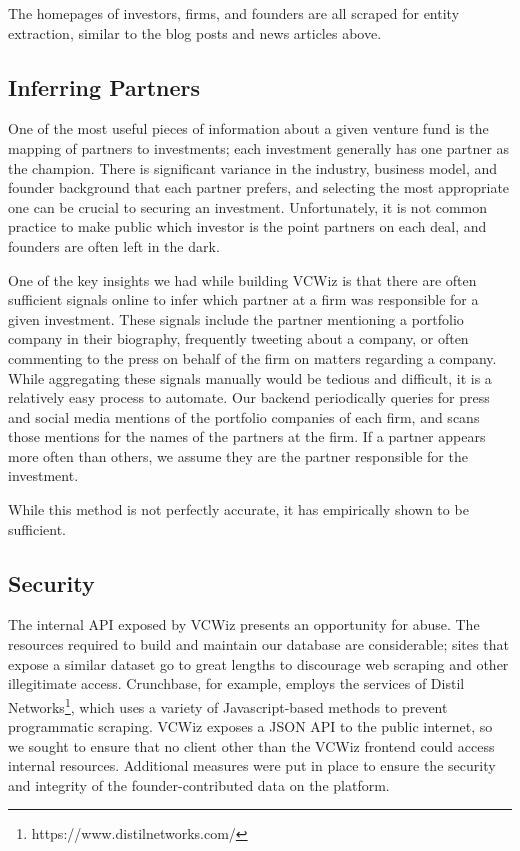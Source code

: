 The homepages of investors, firms, and founders are all scraped for entity extraction, similar to the blog posts and news articles above.

\subsection{Inferring Partners}
\label{ch4:partners}

One of the most useful pieces of information about a given venture fund is the mapping of partners to investments; each investment generally has one partner as the champion. There is significant variance in the industry, business model, and founder background that each partner prefers, and selecting the most appropriate one can be crucial to securing an investment. Unfortunately, it is not common practice to make public which investor is the point partners on each deal, and founders are often left in the dark.

One of the key insights we had while building VCWiz is that there are often sufficient signals online to infer which partner at a firm was responsible for a given investment. These signals include the partner mentioning a portfolio company in their biography, frequently tweeting about a company, or often commenting to the press on behalf of the firm on matters regarding a company. While aggregating these signals manually would be tedious and difficult, it is a relatively easy process to automate. Our backend periodically queries for press and social media mentions of the portfolio companies of each firm, and scans those mentions for the names of the partners at the firm. If a partner appears more often than others, we assume they are the partner responsible for the investment.

While this method is not perfectly accurate, it has empirically shown to be sufficient.

\subsection{Security}

The internal API exposed by VCWiz presents an opportunity for abuse. The resources required to build and maintain our database are considerable; sites that expose a similar dataset go to great lengths to discourage web scraping and other illegitimate access. Crunchbase, for example, employs the services of Distil Networks\footnote{https://www.distilnetworks.com/}, which uses a variety of Javascript-based methods to prevent programmatic scraping. VCWiz exposes a JSON API to the public internet, so we sought to ensure that no client other than the VCWiz frontend could access internal resources. Additional measures were put in place to ensure the security and integrity of the founder-contributed data on the platform.

